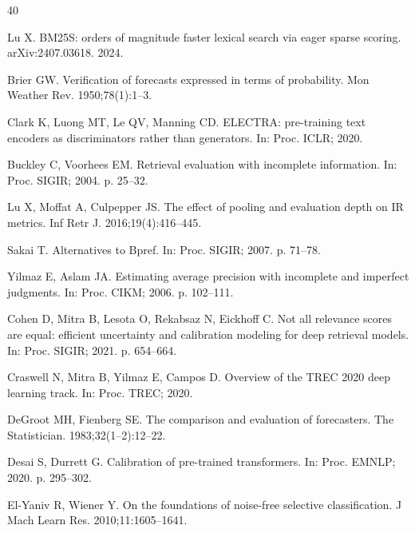 \documentclass[sn-mathphys-num,pdflatex]{sn-jnl}
\begin{document}
\iffalse
\begin{thebibliography}{40}

 Lu X. BM25S: orders of magnitude faster lexical search via
eager sparse scoring. arXiv:2407.03618. 2024.

 Brier GW. Verification of forecasts expressed in terms of
probability. Mon Weather Rev. 1950;78(1):1--3.

 Clark K, Luong MT, Le QV, Manning CD. ELECTRA:
pre-training text encoders as discriminators rather than generators. In: Proc.
ICLR; 2020.

 Buckley C, Voorhees EM. Retrieval evaluation with incomplete
information. In: Proc. SIGIR; 2004. p. 25--32.

 Lu X, Moffat A, Culpepper JS. The effect of pooling and evaluation
depth on IR metrics. Inf Retr J. 2016;19(4):416--445.

 Sakai T. Alternatives to Bpref. In: Proc. SIGIR; 2007. p. 71--78.

 Yilmaz E, Aslam JA. Estimating average precision with incomplete
and imperfect judgments. In: Proc. CIKM; 2006. p. 102--111.

 Cohen D, Mitra B, Lesota O, Rekabsaz N, Eickhoff C. Not all
relevance scores are equal: efficient uncertainty and calibration modeling for
deep retrieval models. In: Proc. SIGIR; 2021. p. 654--664.

 Craswell N, Mitra B, Yilmaz E, Campos D. Overview of the
TREC 2020 deep learning track. In: Proc. TREC; 2020.

 DeGroot MH, Fienberg SE. The comparison and evaluation of
forecasters. The Statistician. 1983;32(1--2):12--22.

 Desai S, Durrett G. Calibration of pre-trained transformers.
In: Proc. EMNLP; 2020. p. 295--302.

 El-Yaniv R, Wiener Y. On the foundations of noise-free selective
classification. J Mach Learn Res. 2010;11:1605--1641.


\end{thebibliography}
\end{document}
